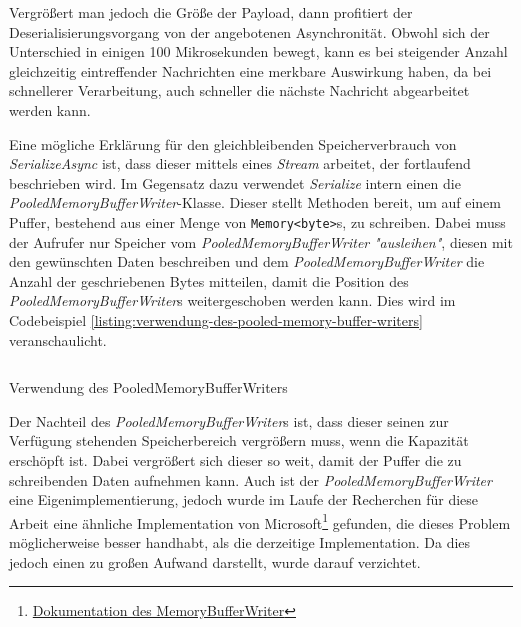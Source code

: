 Vergrößert man jedoch die Größe der Payload, dann profitiert der Deserialisierungsvorgang von der angebotenen Asynchronität. Obwohl sich der Unterschied in einigen 100 Mikrosekunden bewegt, kann es bei steigender Anzahl gleichzeitig eintreffender Nachrichten eine merkbare Auswirkung haben, da bei schnellerer Verarbeitung, auch schneller die nächste Nachricht abgearbeitet werden kann.

Eine mögliche Erklärung für den gleichbleibenden Speicherverbrauch von \textit{SerializeAsync} ist, dass dieser mittels eines \textit{Stream} arbeitet, der fortlaufend beschrieben wird. Im Gegensatz dazu verwendet \textit{Serialize} intern einen die \textit{PooledMemoryBufferWriter}-Klasse. Dieser stellt Methoden bereit, um auf einem Puffer, bestehend aus einer Menge von \texttt{Memory<byte>}s, zu schreiben. Dabei muss der Aufrufer nur Speicher vom \textit{PooledMemoryBufferWriter} \textit{"ausleihen"}, diesen mit den gewünschten Daten beschreiben und dem \textit{PooledMemoryBufferWriter} die Anzahl der geschriebenen Bytes mitteilen, damit die Position des \textit{PooledMemoryBufferWriter}s weitergeschoben werden kann. Dies wird im Codebeispiel \ref{listing:verwendung-des-pooled-memory-buffer-writers} veranschaulicht.

\begin{listing}[h]
    \inputminted[framesep=2mm, baselinestretch=1.2, fontsize=\normalsize, linenos]{csharp}{codes/pooled_memory_buffer_writer_example.cs}
    \caption{Verwendung des PooledMemoryBufferWriters}
    \label{listing:verwendung-des-pooled-memory-buffer-writers}
\end{listing}

Der Nachteil des \textit{PooledMemoryBufferWriter}s ist, dass dieser seinen zur Verfügung stehenden Speicherbereich vergrößern muss, wenn die Kapazität erschöpft ist. Dabei vergrößert sich dieser so weit, damit der Puffer die zu schreibenden Daten aufnehmen kann. Auch ist der \textit{PooledMemoryBufferWriter} eine Eigenimplementierung, jedoch wurde im Laufe der Recherchen für diese Arbeit eine ähnliche Implementation von Microsoft\footnote{\href{https://docs.microsoft.com/en-us/dotnet/api/microsoft.toolkit.highperformance.buffers.memorybufferwriter-1?view=win-comm-toolkit-dotnet-7.0}{Dokumentation des MemoryBufferWriter}} gefunden, die dieses Problem möglicherweise besser handhabt, als die derzeitige Implementation. Da dies jedoch einen zu großen Aufwand darstellt, wurde darauf verzichtet.

